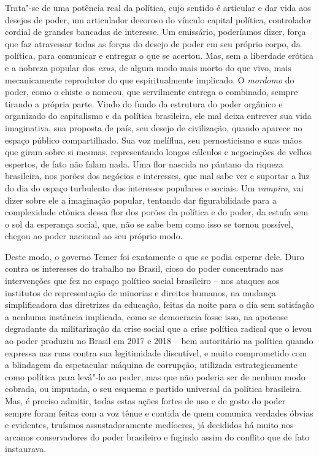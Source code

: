 Trata"-se de uma potência real da política, cujo sentido é articular e
dar vida aos desejos de poder, um articulador decoroso do vínculo
capital política, controlador cordial de grandes bancadas de interesse.
Um emissário, poderíamos dizer, força que faz atravessar todas as
forças do desejo de poder em seu próprio corpo, da política, para
comunicar e entregar o que se acertou. Mas, sem a liberdade erótica e a nobreza
popular dos \emph{exus}, de algum modo mais morto do que vivo, mais
mecanicamente reprodutor do que espiritualmente implicado. O
\emph{mordomo} do poder, como o chiste o nomeou, que servilmente entrega o combinado, sempre
tirando a própria parte. Vindo do fundo da estrutura do poder orgânico e
organizado do capitalismo e da política brasileira, ele mal deixa
entrever sua vida imaginativa, sua proposta de país, seu desejo de
civilização, quando aparece no espaço público compartilhado. Sua voz
melíflua, seu pernosticismo e suas mãos que giram sobre si mesmas, representando longos
cálculos e negociações de velhos espertos, de fato não falam nada. Uma
flor nascida no pântano da riqueza brasileira, nos porões dos negócios e
interesses, que mal sabe ver e suportar a luz do dia do espaço
turbulento dos interesses populares e sociais. Um \emph{vampiro}, vai
dizer sobre ele a imaginação popular, tentando dar figurabilidade para a
complexidade ctônica dessa flor dos porões da política e do poder, da
estufa sem o sol da esperança social, que, não se sabe bem como isso se
tornou possível, chegou ao poder nacional ao seu próprio modo.

Deste modo, o governo Temer foi exatamente o que se podia esperar dele. Duro contra
os interesses do trabalho no Brasil, cioso do poder concentrado nas
intervenções que fez no espaço político social brasileiro -- nos ataques
aos institutos de representação de minorias e direitos humanos, na
mudança simplificadora das diretrizes da educação, feitas da noite para
o dia sem satisfação a nenhuma instância implicada, como se
democracia fosse isso, na apoteose degradante da militarização da crise
social que a crise política radical que o levou ao poder produziu no
Brasil em 2017 e 2018 -- bem autoritário na política quando expressa nas
ruas contra sua legitimidade discutível, e muito comprometido com a
blindagem da espetacular máquina de corrupção, utilizada
estrategicamente como política para levá"-lo ao poder, mas que não poderia ser de
nenhum modo cobrada, ou imputada, o seu esquema e partido universal da
política brasileira. Mas, é preciso admitir, todas estas ações fortes de
uso e de gosto do poder sempre foram feitas com a voz tênue e contida de
quem comunica verdades óbvias e evidentes, truísmos assustadoramente
medíocres, já decididos há muito nos arcanos conservadores do poder
brasileiro e fugindo assim do conflito que de fato instaurava.

